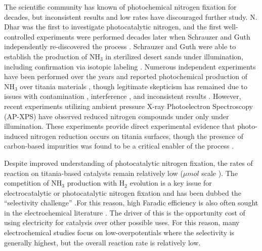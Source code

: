 The scientific community has known of photochemical nitrogen fixation for decades, but inconsistent results and low rates have discouraged further study. \cite{Medford_2017}  N. Dhar \cite{Dhar_1941} was the first to investigate photocatalytic nitrogen, and the first well\hyp{}controlled experiments were performed decades later when Schrauzer and Guth independently re-discovered the process \cite{Schrauzer_1977}. Schrauzer and Guth were able to establish the production of NH$_3$ in sterilized desert sands under illumination, \cite{Schrauzer_1977} including confirmation via isotopic labeling \cite{Schrauzer_1983}. Numerous independent experiments have been performed over the years and reported photochemical production of NH$_3$ over titania materials \cite{Bickley_1979,Augugliaro_1982,Soria_1991,Li_2018,Yuan_2013,Hirakawa_2017}, though legitimate skepticism has remained due to issues with contamination \cite{edwards1992opinion, Davies1995, davies1993reply}, interference \cite{Gao_2018,Cui2018}, and inconsistent results \cite{Medford_2017}. However, recent experiments utilizing ambient pressure X\hyp{}ray Photoelectron Spectroscopy (AP\hyp{}XPS) have observed reduced nitrogen compounds under only under illumination. These experiments provide direct experimental evidence that photo\hyp{}induced nitrogen reduction occurs on titania surfaces, though the presence of carbon-based impurities was found to be a critical enabler of the process \cite{Comer_2018b}. %


Despite improved understanding of photocatalytic nitrogen fixation, the rates of reaction on titania-based catalysts remain relatively low ($\mu mol$ scale \cite{Hirakawa_2017}). The competition of NH$_3$ production with H$_2$ evolution is a key issue for electrocatalytic or photocatalytic nitrogen fixation and has been dubbed the ``selectivity challenge'' \cite{Singh_2017}.For this reason, high Faradic efficiency is also often sought in the electrochemical literature \cite{McPherson_2019}. The driver of this is the opportunity cost of using electricity for catalysis over other possible uses. For this reason, many electrochemical studies focus on low-overpotentials where the selectivity is generally highest, but the overall reaction rate is relatively low.

